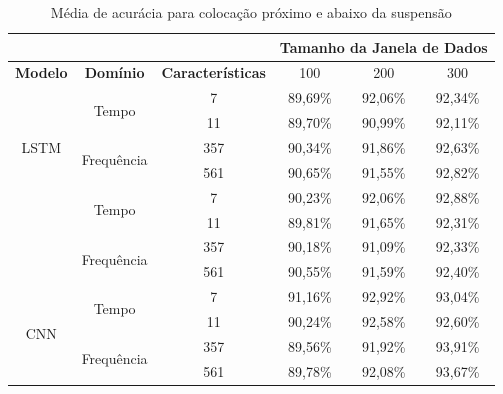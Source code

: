 \begin{table}[h!]
\scriptsize
\centering
\caption{Média de acurácia para colocação próximo e abaixo da suspensão}
\label{table:below_suspension_results_tipo_superficie_2}
\begin{tabular}{cccccc}
\cmidrule(l){4-6} & \multicolumn{1}{l}{\textbf{}} & \multicolumn{1}{l}{} & \multicolumn{3}{c}{\textbf{Tamanho da Janela de Dados}} \\ \midrule
\textbf{Modelo} & \textbf{Domínio} & \textbf{Características} & \multicolumn{1}{c}{100} & \multicolumn{1}{c}{200} & \multicolumn{1}{c}{300} \\ \midrule
\multirow{5}{*}{LSTM} & \multirow{2}{*}{Tempo} 
& 7 & 89,69\% & 92,06\% & 92,34\% \\ \cmidrule(l){3-6} 
&  & 11 & 89,70\% & 90,99\% & 92,11\% \\ \cmidrule(l){2-6} 
& \multirow{2}{*}{Frequência} 
& 357 & 90,34\% & 91,86\% & 92,63\% \\ \cmidrule(l){3-6} 
&  & 561 & 90,65\% & 91,55\% & \cellcolor[HTML]{34FF34}92,82\% \\ \midrule
\multirow{5}{*}{GRU} & \multirow{2}{*}{Tempo} 
& 7 & 90,23\% & 92,06\% & \cellcolor[HTML]{34FF34}92,88\% \\ \cmidrule(l){3-6} 
&  & 11 & 89,81\% & 91,65\% & 92,31\% \\ \cmidrule(l){2-6} 
 & \multirow{2}{*}{Frequência} & 357 & 90,18\% & 91,09\% & 92,33\% \\ \cmidrule(l){3-6} 
 &  & 561 & 90,55\% & 91,59\% & 92,40\% \\ \midrule
\multirow{5}{*}{CNN} & \multirow{2}{*}{Tempo} & 7 & 91,16\% & 92,92\% & 93,04\% \\ \cmidrule(l){3-6} 
 &  & 11 & 90,24\% & 92,58\% & 92,60\% \\ \cmidrule(l){2-6} 
 & \multirow{2}{*}{Frequência} & 357 & 89,56\% & 91,92\% & \cellcolor[HTML]{34FF34}93,91\% \\ \cmidrule(l){3-6} 
 &  & 561 & 89,78\% & 92,08\% & 93,67\% \\ \bottomrule
\end{tabular}
\end{table}

